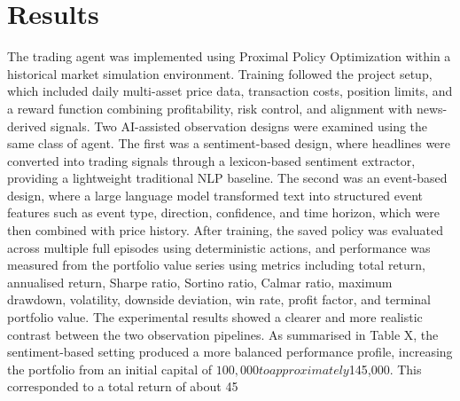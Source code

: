 \documentclass[a4paper,fleqn]{cas-sc}
\begin{document}
\section{Results}\label{sec:results}
The trading agent was implemented using Proximal Policy Optimization within a historical market simulation environment. Training followed the project setup, which included daily multi-asset price data, transaction costs, position limits, and a reward function combining profitability, risk control, and alignment with news-derived signals. Two AI-assisted observation designs were examined using the same class of agent. The first was a sentiment-based design, where headlines were converted into trading signals through a lexicon-based sentiment extractor, providing a lightweight traditional NLP baseline. The second was an event-based design, where a large language model transformed text into structured event features such as event type, direction, confidence, and time horizon, which were then combined with price history. After training, the saved policy was evaluated across multiple full episodes using deterministic actions, and performance was measured from the portfolio value series using metrics including total return, annualised return, Sharpe ratio, Sortino ratio, Calmar ratio, maximum drawdown, volatility, downside deviation, win rate, profit factor, and terminal portfolio value.
The experimental results showed a clearer and more realistic contrast between the two observation pipelines. As summarised in Table X, the sentiment-based setting produced a more balanced performance profile, increasing the portfolio from an initial capital of $100,000 to approximately $145,000. This corresponded to a total return of about 45%
\end{document}
